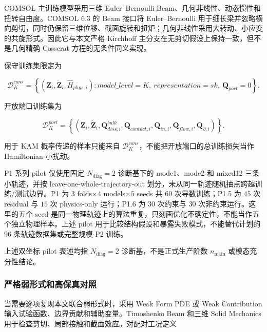 COMSOL 主训练模型采用三维 Euler--Bernoulli Beam、几何非线性、动态惯性和扭转自由度。COMSOL 6.3 的 Beam 接口将 Euler--Bernoulli 用于细长梁并忽略横向剪切，同时仍保留三维位移、截面旋转和扭矩；几何非线性采用大转动、小应变的共旋形式\cite{COMSOLBeamInterface2025,COMSOLGeometricNonlinearity2025,COMSOLSectionStiffness2025}。因此它与本文严格 Kirchhoff 主分支在无剪切假设上保持一致，但不是几何精确 Cosserat 方程的无条件同义实现。

保守训练集限定为

\begin{equation}
\label{eq:chnn-4-20}
\mathcal{D}_{K}^{cons} = \left\{ \left( \mathbf{Z}_{i},{\dot{\mathbf{Z}}}_{i},{\widehat{H}}_{phys,i} \right):model\_ level = K,\ representation = sk,\ \mathbf{Q}_{port} = 0 \right\}.
\end{equation}

开放端口训练集为

\begin{equation}
\label{eq:chnn-4-21}
\mathcal{D}_{K}^{port} = \left\{ \left( \mathbf{Z}_{i},{\dot{\mathbf{Z}}}_{i},\mathbf{Q}_{diss,i}^{bulk},\mathbf{Q}_{contact,i},\mathbf{Q}_{in,i},\mathbf{Q}_{flow,i},\mathbf{Q}_{\partial,i} \right) \right\}.
\end{equation}

用于 KAM 概率传递的样本只能来自 \(\mathcal{D}_{K}^{cons}\)，不能把开放端口的总训练损失当作 Hamiltonian 小扰动。

P1 系列 pilot 仅使用固定 \(N_{\mathrm{diag}}=2\) 诊断基下的 mode1、mode2 和 mixed12 三条小轨迹，并按 leave-one-whole-trajectory-out 划分，未从同一轨迹随机抽点跨越训练/测试边界。P1 为 \(3\) folds\(\times4\) models\(\times5\) seeds 共 \(60\) 次导数训练；P1.5 为 \(45\) 次 residual 与 \(15\) 次 physics-only 运行；P1.6 为 \(30\) 次约束与 \(30\) 次非约束运行。这里的五个 seed 是同一物理轨迹上的算法重复，只刻画优化不确定性，不能当作五个独立物理样本。上述 pilot 用于比较结构假设和暴露失败模式，不能替代计划的 96 条轨迹数据集或完整规模 P2 训练。

上述双坐标 pilot 表述均指 \(N_{\mathrm{diag}}=2\) 诊断基，不是正式生产阶数 \(n_{\mathrm{main}}\) 或模态充分性结论。

\subsubsection{严格弱形式和高保真对照}\label{sec:chnn-4-4-2}

当需要逐项复现本文联合弱形式时，采用 Weak Form PDE 或 Weak Contribution 输入试验函数、边界贡献和辅助变量\cite{COMSOLWeakFormPDE2025,COMSOLWeakContribution2025}。Timoshenko Beam 和三维 Solid Mechanics 用于检查剪切、局部接触和截面效应。对配对工况定义

